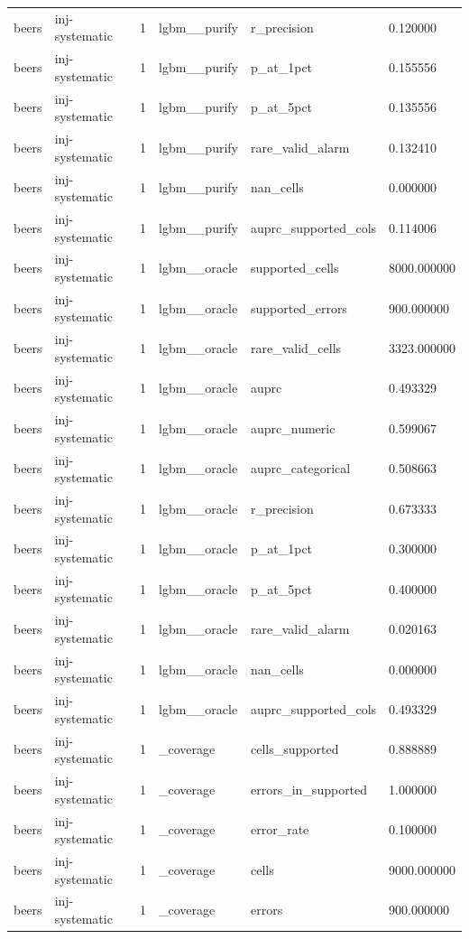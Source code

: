 \begin{tabular}{llllll}
beers & inj-systematic & 1 & lgbm\_\_purify & r\_precision & 0.120000 \\
beers & inj-systematic & 1 & lgbm\_\_purify & p\_at\_1pct & 0.155556 \\
beers & inj-systematic & 1 & lgbm\_\_purify & p\_at\_5pct & 0.135556 \\
beers & inj-systematic & 1 & lgbm\_\_purify & rare\_valid\_alarm & 0.132410 \\
beers & inj-systematic & 1 & lgbm\_\_purify & nan\_cells & 0.000000 \\
beers & inj-systematic & 1 & lgbm\_\_purify & auprc\_supported\_cols & 0.114006 \\
beers & inj-systematic & 1 & lgbm\_\_oracle & supported\_cells & 8000.000000 \\
beers & inj-systematic & 1 & lgbm\_\_oracle & supported\_errors & 900.000000 \\
beers & inj-systematic & 1 & lgbm\_\_oracle & rare\_valid\_cells & 3323.000000 \\
beers & inj-systematic & 1 & lgbm\_\_oracle & auprc & 0.493329 \\
beers & inj-systematic & 1 & lgbm\_\_oracle & auprc\_numeric & 0.599067 \\
beers & inj-systematic & 1 & lgbm\_\_oracle & auprc\_categorical & 0.508663 \\
beers & inj-systematic & 1 & lgbm\_\_oracle & r\_precision & 0.673333 \\
beers & inj-systematic & 1 & lgbm\_\_oracle & p\_at\_1pct & 0.300000 \\
beers & inj-systematic & 1 & lgbm\_\_oracle & p\_at\_5pct & 0.400000 \\
beers & inj-systematic & 1 & lgbm\_\_oracle & rare\_valid\_alarm & 0.020163 \\
beers & inj-systematic & 1 & lgbm\_\_oracle & nan\_cells & 0.000000 \\
beers & inj-systematic & 1 & lgbm\_\_oracle & auprc\_supported\_cols & 0.493329 \\
beers & inj-systematic & 1 & \_coverage & cells\_supported & 0.888889 \\
beers & inj-systematic & 1 & \_coverage & errors\_in\_supported & 1.000000 \\
beers & inj-systematic & 1 & \_coverage & error\_rate & 0.100000 \\
beers & inj-systematic & 1 & \_coverage & cells & 9000.000000 \\
beers & inj-systematic & 1 & \_coverage & errors & 900.000000 \\

\end{tabular}
